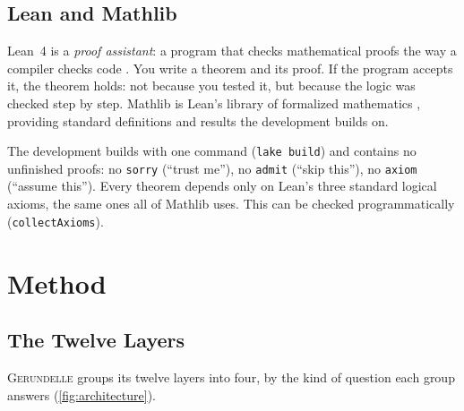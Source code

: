 \documentclass[11pt]{article}
\newcommand{\gerundelle}{\textsc{Gerundelle}}
\newcommand{\leanus}{\textunderscore\allowbreak}
\newcommand{\lean}[1]{{\let\_\leanus\texttt{#1}}}
\theoremstyle{remark}
\begin{document}
\subsection{Lean and Mathlib}

Lean~4 is a \emph{proof assistant}: a program that checks mathematical proofs the way a
compiler checks code \citep{deMouraUllrich2021}. You write a theorem and its proof. If the
program accepts it, the theorem holds: not because you tested it, but because the logic
was checked step by step. Mathlib is Lean's library of formalized mathematics
\citep{MathlibCommunity2020}, providing standard definitions and results the development
builds on.

The development builds with one command (\lean{lake build}) and contains no unfinished
proofs: no \lean{sorry} (``trust me''), no \lean{admit} (``skip this''), no \lean{axiom}
(``assume this''). Every theorem depends only on Lean's three standard logical axioms, the
same ones all of Mathlib uses. This can be checked programmatically
(\lean{collectAxioms}).


\section{Method}
\label{sec:method}

\subsection{The Twelve Layers}
\label{sec:architecture}

\gerundelle{} groups its twelve layers into four, by the kind of question each group
answers (\cref{fig:architecture}).
\end{document}
